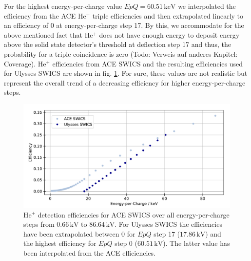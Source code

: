 For the highest energy-per-charge value $EpQ = 60.51\,\mathrm{keV}$ we interpolated the efficiency from the ACE $\mathrm{He^{+}}$ triple efficiencies and then extrapolated linearly to an efficiency of 0 at energy-per-charge step 17. By this, we accommodate for the above mentioned fact that $\mathrm{He^{+}}$ does not have enough energy to deposit energy above the solid state detector's threshold at deflection step 17 and thus, the probability for a triple coincidence is zero (Todo: Verweis auf anderes Kapitel: Coverage). $\mathrm{He^{+}}$ efficiencies from ACE SWICS and the resulting efficiencies used for Ulysses SWICS are shown in fig. \ref{fig:guess_eff}. For sure, these values are not realistic but represent the overall trend of a decreasing efficiency for higher energy-per-charge steps.
\begin{figure}[h]
	\includegraphics[width=1.\textwidth]{Figures/guess_eff.pdf}
	\centering
	\caption{$\mathrm{He^{+}}$ detection efficiencies for ACE SWICS over all energy-per-charge steps from $0.66\,\mathrm{kV}$ to $86.64\,\mathrm{kV}$. For Ulysses SWICS the efficiencies have been extrapolated between 0 for $EpQ$ step 17 ($17.86\,\mathrm{kV}$) and the highest efficiency for $EpQ$ step 0 ($60.51\,\mathrm{kV}$). The latter value has been interpolated from the ACE efficiencies.}
	\label{fig:guess_eff}
\end{figure}


